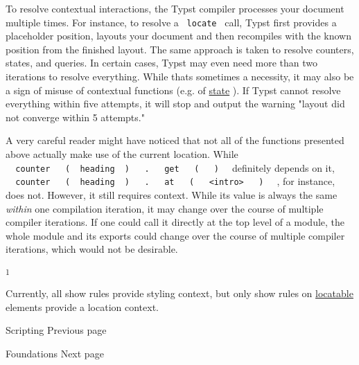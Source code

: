 To resolve contextual interactions, the Typst compiler processes your
document multiple times. For instance, to resolve a \texttt{\ locate\ }
call, Typst first provides a placeholder position, layouts your document
and then recompiles with the known position from the finished layout.
The same approach is taken to resolve counters, states, and queries. In
certain cases, Typst may even need more than two iterations to resolve
everything. While that\textquotesingle s sometimes a necessity, it may
also be a sign of misuse of contextual functions (e.g. of
\href{/docs/reference/introspection/state/\#caution}{state} ). If Typst
cannot resolve everything within five attempts, it will stop and output
the warning "layout did not converge within 5 attempts."

A very careful reader might have noticed that not all of the functions
presented above actually make use of the current location. While
\texttt{\ }{\texttt{\ counter\ }}\texttt{\ }{\texttt{\ (\ }}\texttt{\ heading\ }{\texttt{\ )\ }}\texttt{\ }{\texttt{\ .\ }}\texttt{\ }{\texttt{\ get\ }}\texttt{\ }{\texttt{\ (\ }}\texttt{\ }{\texttt{\ )\ }}\texttt{\ }
definitely depends on it,
\texttt{\ }{\texttt{\ counter\ }}\texttt{\ }{\texttt{\ (\ }}\texttt{\ heading\ }{\texttt{\ )\ }}\texttt{\ }{\texttt{\ .\ }}\texttt{\ }{\texttt{\ at\ }}\texttt{\ }{\texttt{\ (\ }}\texttt{\ }{\texttt{\ \textless{}intro\textgreater{}\ }}\texttt{\ }{\texttt{\ )\ }}\texttt{\ }
, for instance, does not. However, it still requires context. While its
value is always the same \emph{within} one compilation iteration, it may
change over the course of multiple compiler iterations. If one could
call it directly at the top level of a module, the whole module and its
exports could change over the course of multiple compiler iterations,
which would not be desirable.

\label{1}
\textsuperscript{1}

Currently, all show rules provide styling context, but only show rules
on \href{/docs/reference/introspection/location/\#locatable}{locatable}
elements provide a location context.

\href{/docs/reference/scripting/}{\pandocbounded{}}

{ Scripting } { Previous page }

\href{/docs/reference/foundations/}{\pandocbounded{}}

{ Foundations } { Next page }


